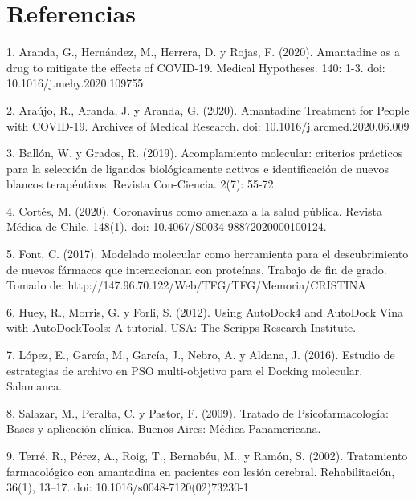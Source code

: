 \documentclass[12pt]{article}
\begin{document}
	
\section{Referencias}
\label{chap:Referencias}
1. Aranda, G., Hernández, M., Herrera, D. y Rojas, F. (2020). Amantadine as a drug to mitigate the effects of COVID-19. Medical Hypotheses. 140: 1-3. doi: 10.1016/j.mehy.2020.109755 

2. Araújo, R., Aranda, J. y Aranda, G. (2020). Amantadine Treatment for People with COVID-19. Archives of Medical Research. doi: 10.1016/j.arcmed.2020.06.009

3. Ballón, W. y Grados, R. (2019). Acomplamiento molecular: criterios prácticos para la selección de ligandos biológicamente activos e identificación de nuevos blancos terapéuticos. Revista Con-Ciencia. 2(7): 55-72. 

4. Cortés, M. (2020). Coronavirus como amenaza a la salud pública. Revista Médica de Chile. 148(1).  doi: 10.4067/S0034-98872020000100124.

5. Font, C. (2017). Modelado molecular como herramienta para el descubrimiento de nuevos fármacos que interaccionan con proteínas. Trabajo de fin de grado. Tomado de: http://147.96.70.122/Web/TFG/TFG/Memoria/CRISTINA%

6. Huey, R., Morris, G. y Forli, S. (2012). Using AutoDock4 and AutoDock Vina with AutoDockTools: A tutorial. USA: The Scripps Research Institute. 

7. López, E., García, M., García, J., Nebro, A. y Aldana, J. (2016). Estudio de estrategias de archivo en PSO multi-objetivo para el Docking molecular. Salamanca.

8. Salazar, M., Peralta, C. y Pastor, F. (2009). Tratado de Psicofarmacología: Bases y aplicación clínica. Buenos Aires: Médica Panamericana. 

9. Terré, R., Pérez, A., Roig, T., Bernabéu, M., y Ramón, S. (2002). Tratamiento farmacológico con amantadina en pacientes con lesión cerebral. Rehabilitación, 36(1), 13–17. doi: 10.1016/s0048-7120(02)73230-1 
\end{document}
